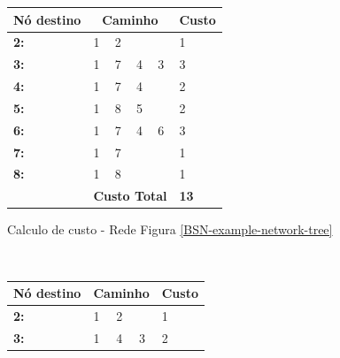 \setcounter{table}{1} \renewcommand{\thetable}{\arabic{table}}
\begin{table}[t!]
	\centering
	\begin{subfigure}[t]{0.4\textwidth}
		\centering
			\begin{tabular}{llllll}
			\hline
			\multicolumn{1}{|l|}{\textbf{Nó destino}} & \multicolumn{4}{c}{\textbf{Caminho}} & \multicolumn{1}{c|}{\textbf{Custo}} \\ \hline
			\multicolumn{1}{|l|}{\textbf{2:}} & 1 & 2 &  & \multicolumn{1}{l|}{} & \multicolumn{1}{l|}{1} \\ \hline
			\multicolumn{1}{|l|}{\textbf{3:}} & 1 & 7 & 4 & \multicolumn{1}{l|}{3} & \multicolumn{1}{l|}{3} \\ \hline
			\multicolumn{1}{|l|}{\textbf{4:}} & 1 & 7 & 4 & \multicolumn{1}{l|}{} & \multicolumn{1}{l|}{2} \\ \hline
			\multicolumn{1}{|l|}{\textbf{5:}} & 1 & 8 & 5 & \multicolumn{1}{l|}{} & \multicolumn{1}{l|}{2} \\ \hline
			\multicolumn{1}{|l|}{\textbf{6:}} & 1 & 7 & 4 & \multicolumn{1}{l|}{6} & \multicolumn{1}{l|}{3} \\ \hline
			\multicolumn{1}{|l|}{\textbf{7:}} & 1 & 7 &  & \multicolumn{1}{l|}{} & \multicolumn{1}{l|}{1} \\ \hline
			\multicolumn{1}{|l|}{\textbf{8:}} & 1 & 8 &  & \multicolumn{1}{l|}{} & \multicolumn{1}{l|}{1} \\ \hline
			 & \multicolumn{4}{l}{\textbf{Custo Total}} & \textbf{13}
			\end{tabular}
		\caption{Calculo de custo - Rede Figura \ref{BSN-example-network-tree}}
		\label{tab-custo-rede-BSN-example-network-tree}
	\end{subfigure}%
	~
	\begin{subfigure}[t]{0.4\textwidth}
		\centering
			\begin{tabular}{lllll}
			\hline
			\multicolumn{1}{|l|}{\textbf{Nó destino}} & \multicolumn{3}{c}{\textbf{Caminho}} & \multicolumn{1}{c|}{\textbf{Custo}} \\ \hline
			\multicolumn{1}{|l|}{\textbf{2:}} & 1 & 2 & \multicolumn{1}{l|}{} & \multicolumn{1}{l|}{1} \\ \hline
			\multicolumn{1}{|l|}{\textbf{3:}} & 1 & 4 & \multicolumn{1}{l|}{3} & \multicolumn{1}{l|}{2} \\ \hline

\end{tabular}
\end{subfigure}
\end{table}
